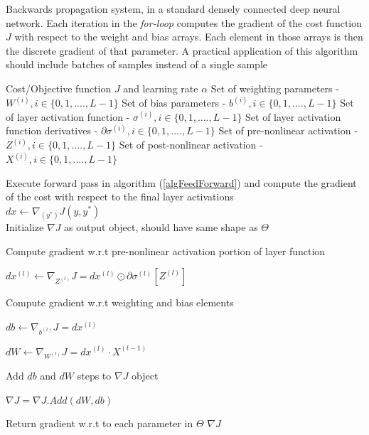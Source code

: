 \documentclass[12pt,letterpaper]{article}
\begin{document}
\begin{algorithm}[H]
\caption{Backwards propagation system, in a standard densely connected deep neural network. Each iteration in the \textit{for-loop} computes the gradient of the cost function $J$ with respect to the weight and bias arrays. Each element in those arrays is then the discrete gradient of that parameter. A practical application of this algorithm should include batches of samples instead of a single sample}
\label{algBackProp}

\begin{algorithmic}
\REQUIRE Cost/Objective function $J$ and learning rate $\alpha$
\REQUIRE Set of weighting parameters - $W^{(i)}, i \in \{0,1,....,L-1\}$
\REQUIRE Set of bias parameters - $b^{(i)}, i \in \{0,1,....,L-1\}$
\REQUIRE Set of layer activation function - $\sigma^{(i)}, i \in \{0,1,....,L-1\}$
\REQUIRE Set of layer activation function derivatives - $\partial\sigma^{(i)}, i \in \{0,1,....,L-1\}$
\REQUIRE Set of pre-nonlinear activation - $Z^{(i)}, i \in \{0,1,....,L-1\}$
\REQUIRE Set of post-nonlinear activation - $X^{(i)}, i \in \{0,1,....,L-1\}$

Execute forward pass in algorithm (\ref{algFeedForward}) and compute the gradient of the cost with respect to the final layer activations \\
$dx \leftarrow \nabla_{(y^*)}J(y,y^*)$ \\
Initialize $\nabla J$ as output object, should have same shape as $\Theta$

	\item Compute gradient w.r.t pre-nonlinear activation portion of layer function
	\item $dx^{(l)} \leftarrow \nabla_{Z^{(l)}}J = dx^{(l)} \odot \partial\sigma^{(l)}[ Z^{(l)} ]$
	\item Compute gradient w.r.t weighting and bias elements
	\item $db \leftarrow \nabla_{b^{(l)}}J = dx^{(l)}$
	\item $dW \leftarrow \nabla_{W^{(l)}}J = dx^{(l)} \cdot X^{(l-1)}$

	\item Add $db$ and $dW$ steps to $\nabla J$ object
	\item $\nabla J = \nabla J .Add(dW,db)$
\ENDFOR

\item Return gradient w.r.t to each parameter in $\Theta$
\RETURN $\nabla J$

\end{algorithmic}
\end{algorithm}
\end{document}
